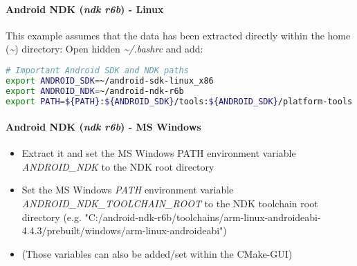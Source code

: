 \paragraph{Android \ac{NDK} (\emph{ndk r6b}) - Linux}
This example assumes that the data has been extracted directly within the home (\emph{\textasciitilde}) directory: Open hidden \emph{\textasciitilde /.bashrc} and add:
\begin{lstlisting}[language=sh]
# Important Android SDK and NDK paths
export ANDROID_SDK=~/android-sdk-linux_x86
export ANDROID_NDK=~/android-ndk-r6b
export PATH=${PATH}:${ANDROID_SDK}/tools:${ANDROID_SDK}/platform-tools:~/${ANDROID_NDK}
\end{lstlisting}


\paragraph{Android \ac{NDK} (\emph{ndk r6b}) - \ac{MS} Windows}
\begin{itemize}
\item{Extract it and set the \ac{MS} Windows PATH environment variable \emph{ANDROID\_NDK} to the \ac{NDK} root directory}
\item{Set the \ac{MS} Windows \emph{PATH} environment variable \emph{ANDROID\_NDK\_TOOLCHAIN\_ROOT} to the \ac{NDK} toolchain root directory (e.g. "C:/android-ndk-r6b/toolchains/arm-linux-androideabi-4.4.3/prebuilt/windows/arm-linux-androideabi")}
\item{(Those variables can also be added/set within the CMake-\ac{GUI})}
\end{itemize}


